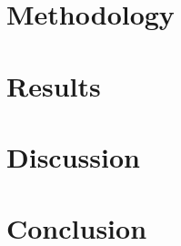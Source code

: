 \documentclass[12pt,a4paper]{article}
\begin{document}
\section{Methodology}
\label{sec:methodology}

\section{Results}
\label{sec:results}

\section{Discussion}
\label{sec:discussion}

\section{Conclusion}
\label{sec:conclusion}

\appendix
 

\end{document}
